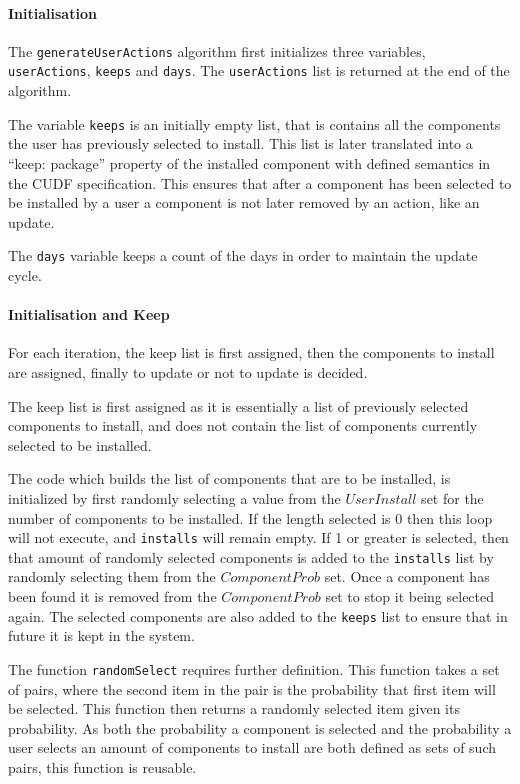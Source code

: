 \paragraph{Initialisation}
The \verb+generateUserActions+ algorithm first initializes three variables, \verb+userActions+, \verb+keeps+ and \verb+days+.
The \verb+userActions+ list is returned at the end of the algorithm.

The variable \verb+keeps+ is an initially empty list, that is contains all the components the user has previously selected to install.
This list is later translated into a ``keep: package'' property of the installed component with defined semantics in the CUDF specification.
This ensures that after a component has been selected to be installed by a user a component is not later removed by an action, like an update.

The \verb+days+ variable keeps a count of the days in order to maintain the update cycle. 

\paragraph{Initialisation and Keep}
For each iteration, the keep list is first assigned, then the components to install are assigned, finally to update or not to update is decided.

The keep list is first assigned as it is essentially a list of previously selected components to install, and does not contain the list of components currently selected to be installed.

The code which builds the list of components that are to be installed, is initialized by first randomly selecting a value from the $UserInstall$ set for the number of components to be installed.
If the length selected is 0 then this loop will not execute, and \verb+installs+ will remain empty.
If 1 or greater is selected, then that amount of randomly selected components is added to the \verb+installs+ list by randomly selecting them from the $ComponentProb$ set.
Once a component has been found it is removed from the $ComponentProb$ set to stop it being selected again.
The selected components are also added to the \verb+keeps+ list to ensure that in future it is kept in the system.
 
The function \verb+randomSelect+ requires further definition.
This function takes a set of pairs, where the second item in the pair is the probability that first item will be selected.
This function then returns a randomly selected item given its probability.
As both the probability a component is selected and the probability a user selects an amount of components to install are both defined as sets of such pairs, this function is reusable.

